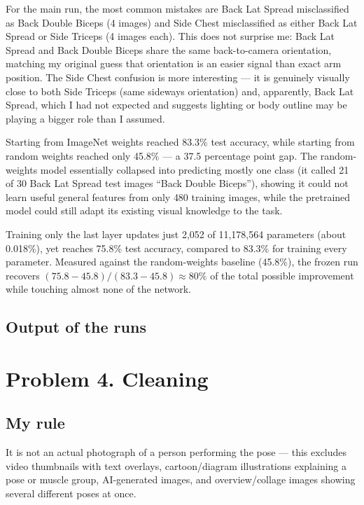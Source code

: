 \documentclass[11pt]{article}
\begin{document}
For the main run, the most common mistakes are Back Lat Spread misclassified as Back Double Biceps (4 images) and Side Chest misclassified as either Back Lat Spread or Side Triceps (4 images each). This does not surprise me: Back Lat Spread and Back Double Biceps share the same back-to-camera orientation, matching my original guess that orientation is an easier signal than exact arm position. The Side Chest confusion is more interesting --- it is genuinely visually close to both Side Triceps (same sideways orientation) and, apparently, Back Lat Spread, which I had not expected and suggests lighting or body outline may be playing a bigger role than I assumed.

Starting from ImageNet weights reached 83.3\% test accuracy, while starting from random weights reached only 45.8\% --- a 37.5 percentage point gap. The random-weights model essentially collapsed into predicting mostly one class (it called 21 of 30 Back Lat Spread test images ``Back Double Biceps''), showing it could not learn useful general features from only 480 training images, while the pretrained model could still adapt its existing visual knowledge to the task.

Training only the last layer updates just 2,052 of 11,178,564 parameters (about 0.018\%), yet reaches 75.8\% test accuracy, compared to 83.3\% for training every parameter. Measured against the random-weights baseline (45.8\%), the frozen run recovers $(75.8 - 45.8) / (83.3 - 45.8) \approx 80\%$ of the total possible improvement while touching almost none of the network.

\subsection*{Output of the runs}

\section*{Problem 4. Cleaning}

\subsection*{My rule}
It is not an actual photograph of a person performing the pose — this excludes video thumbnails with text overlays, cartoon/diagram illustrations explaining a pose or muscle group, AI-generated images, and overview/collage images showing several different poses at once.
\end{document}
